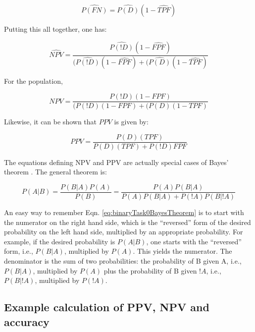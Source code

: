 \documentclass[
]{book}
\begin{document}
\begin{equation} 
\widehat{P(FN)}=\widehat{P(D)}(1-\widehat{TPF})
\label{eq:binaryTask0PFNEst}
\end{equation}

Putting this all together, one has:

\begin{equation} 
\widehat{NPV}=\frac{\widehat{P(!D)}(1-\widehat{FPF})}{(\widehat{P(!D)}(1-\widehat{FPF})+(\widehat{P(D)}(1-\widehat{TPF})}
\label{eq:binaryTask0NPVFormula}
\end{equation}

For the population,

\begin{equation} 
NPV=\frac{P(!D)(1-FPF)}{(P(!D)(1-FPF)+(P(D)(1-TPF)}
\label{eq:binaryTask0NPVFormula-pop}
\end{equation}

Likewise, it can be shown that \(PPV\) is given by:

\begin{equation} 
PPV =\frac{P(D)(TPF)}{P(D)(TPF)+P(!D)FPF}
\label{eq:binaryTask0PPV}
\end{equation}

The equations defining NPV and PPV are actually special cases of Bayes' theorem \citep{RN1492}. The general theorem is:

\begin{equation} 
P(A|B)=\frac{P(B|A)P(A)}{P(B)}=\frac{P(A)P(B|A)}{P(A)P(B|A)+P(!A)P(B|!A)}
\label{eq:binaryTask0BayesTheorem}
\end{equation}

An easy way to remember Eqn. \eqref{eq:binaryTask0BayesTheorem} is to start with the numerator on the right hand side, which is the ``reversed'' form of the desired probability on the left hand side, multiplied by an appropriate probability. For example, if the desired probability is \(P(A|B)\), one starts with the ``reversed'' form, i.e., \(P(B|A)\), multiplied by \(P(A)\). This yields the numerator. The denominator is the sum of two probabilities: the probability of B given A, i.e., \(P(B|A)\), multiplied by \(P(A)\) plus the probability of B given \(!A\), i.e., \(P(B|!A)\), multiplied by \(P(!A)\).

\hypertarget{binaryTask0NpvPpvCode}{%
\subsection{Example calculation of PPV, NPV and accuracy}\label{binaryTask0NpvPpvCode}}
\end{document}
